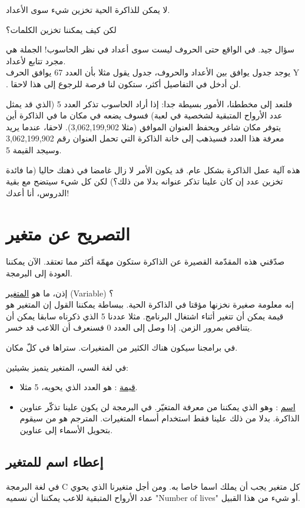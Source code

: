 لا يمكن للذاكرة الحية تخزين شيء سوى الأعداد.

\begin{question}
  لكن كيف يمكننا تخزين الكلمات؟
\end{question}

سؤال جيد. في الواقع حتى الحروف ليست سوى أعداد في نظر الحاسوب! الجملة هي مجرد تتابع لأعداد.\\
يوجد جدول يوافق بين الأعداد والحروف، جدول يقول مثلا بأن العدد 67 يوافق الحرف
\textenglish{Y}
. لن أدخل في التفاصيل أكثر، ستكون لنا فرصة للرجوع إلى هذا لاحقا.

فلنعد إلى مخططنا، الأمور بسيطة جدا: إذا أراد الحاسوب تذكر العدد 5 (الذي قد يمثل عدد الأرواح المتبقية لشخصية في لعبة) فسوف يضعه في مكان ما في الذاكرة أين يتوفر مكان شاغر ويحفظ العنوان الموافق (مثلا 3,062,199,902). لاحقا، عندما يريد معرفة هذا العدد فسيذهب إلى خانة الذاكرة التي تحمل العنوان رقم 3,062,199,902 وسيجد القيمة 5.

هذه آلية عمل الذاكرة بشكل عام. قد يكون الأمر لا زال غامضا في ذهنك حاليا (ما فائدة تخزين عدد إن كان علينا تذكر عنوانه بدلا من ذلك؟) لكن كل شيء سيتضح مع بقية الدروس، أنا أعدك!

\section{التصريح عن متغير}
صدّقني هذه المقدّمة القصيرة عن الذاكرة ستكون مهمّة أكثر مما تعتقد. الآن يمكننا العودة إلى البرمجة.

إذن، ما هو
\underline{المتغير}
(\textenglish{Variable}) ؟\\
إنه معلومة صغيرة نخزنها مؤقتا في الذاكرة الحية. ببساطة يمكننا القول إن المتغير هو قيمة يمكن أن تتغير أثناء اشتغال البرنامج. مثلا عددنا 5 الذي ذكرناه سابقا يمكن أن يتناقص بمرور الزمن. إذا وصل إلى العدد 0 فسنعرف أن اللاعب قد خسر.

في برامجنا سيكون هناك الكثير من المتغيرات. ستراها في كلّ مكان.

في لغة السي، المتغير يتميز بشيئين:
\begin{itemize}
  \item \underline{قيمة}
: هو العدد الذي يحويه، 5 مثلا.
  \item \underline{اسم}
: وهو الذي يمكننا من معرفة المتغيّر. في البرمجة لن يكون علينا تذكّر عناوين الذاكرة. بدلا من ذلك علينا فقط استخدام أسماء المتغيرات. المترجم هو من سيقوم بتحويل الأسماء إلى عناوين.
\end{itemize}

\subsection{إعطاء اسم للمتغير}
في لغة البرمجة
\textenglish{C}
كل متغير يجب أن يملك اسما خاصا به. ومن أجل متغيرنا الذي يحوي عدد الأرواح المتبقية للاعب يمكننا أن نسميه
"\textenglish{Number of lives}"
أو شيء من هذا القبيل.

